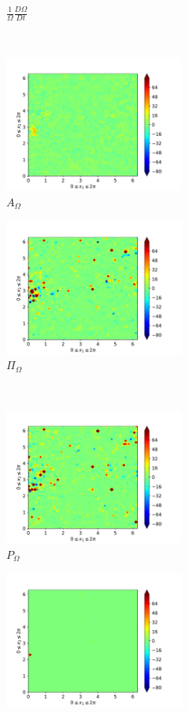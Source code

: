 \begin{figure}[H]
\begin{subfigure}[H]{0.45\textwidth}
        \caption{$\frac{1}{\Omega} \frac{D \Omega}{Dt}$}
    \end{subfigure}
    ~
    \begin{subfigure}{0.45\textwidth}
        \includegraphics[height=1.75in]{media/run-cds-65/A-enst-1480}
        \caption{$A_{\Omega}$}
    \end{subfigure}
    \newline
    \begin{subfigure}{0.45\textwidth}
        \includegraphics[height=1.75in]{media/run-cds-65/Pi-enst-1480}
        \caption{$\Pi_{\Omega}$}
    \end{subfigure}
    ~
    \begin{subfigure}{0.45\textwidth}
        \includegraphics[height=1.75in]{media/run-cds-65/P-enst-1480}
        \caption{$P_{\Omega}$}
    \end{subfigure}
    \newline
    \begin{subfigure}{0.45\textwidth}
        \includegraphics[height=1.75in]{media/run-cds-65/B-enst-1480}

\end{subfigure}
\end{figure}

